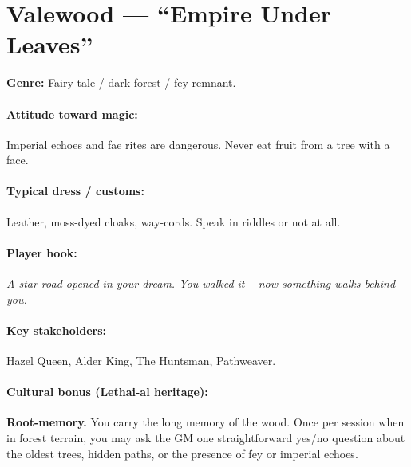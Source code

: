 \section{Valewood --- ``Empire Under Leaves''}
\textbf{Genre:} Fairy tale / dark forest / fey remnant.

\paragraph{Attitude toward magic:} Imperial echoes and fae rites are dangerous. Never eat fruit from a tree with a face.

\paragraph{Typical dress / customs:} Leather, moss-dyed cloaks, way-cords. Speak in riddles or not at all.

\paragraph{Player hook:} \emph{A star-road opened in your dream. You walked it -- now something walks behind you.}

\paragraph{Key stakeholders:} Hazel Queen, Alder King, The Huntsman, Pathweaver.

\paragraph{Cultural bonus (Lethai-al heritage):} \textbf{Root-memory.} You carry the long memory of the wood. Once per session when in forest terrain, you may ask the GM one straightforward yes/no question about the oldest trees, hidden paths, or the presence of fey or imperial echoes.

